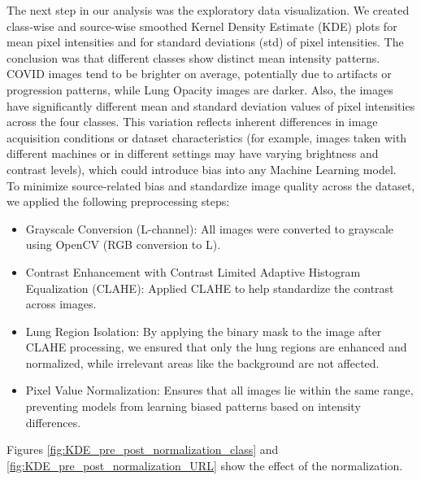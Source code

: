 \documentclass{article}
\begin{document}
The next step in our analysis was the exploratory data visualization. We created class-wise and source-wise smoothed Kernel Density Estimate (KDE) plots for mean pixel intensities and for standard deviations (std) of pixel intensities. The conclusion was that different classes show distinct mean intensity patterns. COVID images tend to be brighter on average, potentially due to artifacts or progression patterns, while Lung Opacity images are darker. Also, the images have significantly different mean and standard deviation values of pixel intensities across the four classes. This variation reflects inherent differences in image acquisition conditions or dataset characteristics (for example, images taken with different machines or in different settings may have varying brightness and contrast levels), which could introduce bias into any Machine Learning model.\\
To minimize source-related bias and standardize image quality across the dataset, we applied the following preprocessing steps:
\begin{itemize}
    \item Grayscale Conversion (L-channel): All images were converted to grayscale using OpenCV (RGB conversion to L).
    \item Contrast Enhancement with Contrast Limited Adaptive Histogram Equalization (CLAHE): Applied CLAHE to help standardize the contrast across images.
    \item Lung Region Isolation: By applying the binary mask to the image after CLAHE processing, we ensured that only the lung regions are enhanced and normalized, while irrelevant areas like the background are not affected.
     \item Pixel Value Normalization: Ensures that all images lie within the same range, preventing models from learning biased patterns based on intensity differences.
\end{itemize}

Figures \ref{fig:KDE_pre_post_normalization_class} and \ref{fig:KDE_pre_post_normalization_URL} show the effect of the normalization. 
\end{document}
